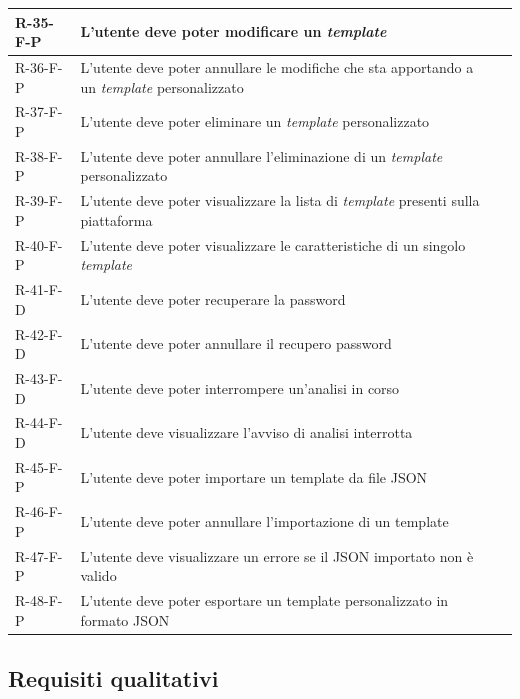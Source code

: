 \begin{longtable}{L{2cm} L{6.4cm} L{3cm}}
\hline
R-35-F-P & L'utente deve poter modificare un \emph{template} &  \\
\hline
R-36-F-P & L'utente deve poter annullare le modifiche che sta apportando a un \emph{template} personalizzato &  \\
\hline
R-37-F-P & L'utente deve poter eliminare un \emph{template} personalizzato &  \\
\hline
R-38-F-P & L'utente deve poter annullare l'eliminazione di un \emph{template} personalizzato &  \\
\hline
R-39-F-P & L'utente deve poter visualizzare la lista di \emph{template} presenti sulla piattaforma &  \\
\hline
R-40-F-P & L'utente deve poter visualizzare le caratteristiche di un singolo \emph{template} &  \\
\hline
R-41-F-D & L'utente deve poter recuperare la password &  \\
\hline
R-42-F-D & L'utente deve poter annullare il recupero password &  \\
\hline
R-43-F-D & L'utente deve poter interrompere un'analisi in corso &  \\
\hline
R-44-F-D & L'utente deve visualizzare l'avviso di analisi interrotta &  \\
\hline
R-45-F-P & L'utente deve poter importare un template da file JSON &  \\
\hline
R-46-F-P & L'utente deve poter annullare l'importazione di un template &  \\
\hline
R-47-F-P & L'utente deve visualizzare un errore se il JSON importato non è valido &  \\
\hline
R-48-F-P & L'utente deve poter esportare un template personalizzato in formato JSON &  \\
\end{longtable}
\label{tab:requisiti-funzionali}
\endgroup

\subsection{Requisiti qualitativi}

